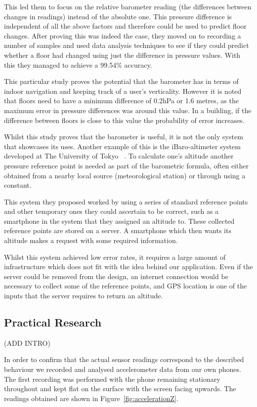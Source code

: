 \documentclass[12pt,a4paper]{report}
\begin{document}
This led them to focus on the relative barometer reading (the differences between changes in readings) instead of the absolute one. This pressure difference is independent of all the above factors and therefore could be used to predict floor changes. After proving this was indeed the case, they moved on to recording a number of samples and used data analysis techniques to see if they could predict whether a floor had changed using just the difference in pressure values. With this they managed to achieve a 99.54\% accuracy.

This particular study proves the potential that the barometer has in terms of indoor navigation and keeping track of a user's verticality. However it is noted that floors need to have a minimum difference of 0.2hPa or 1.6 metres, as the maximum error in pressure differences was around this value. In a building, if the difference between floors is close to this value the probability of error increases.

Whilst this study proves that the barometer is useful, it is not the only system that showcases its uses. Another example of this is the iBaro-altimeter system developed at The University of Tokyo ~\cite{baro22014}. To calculate one's altitude another pressure reference point is needed as part of the barometric formula, often either obtained from a nearby local source (meteorological station) or through using a constant.

This system they proposed worked by using a series of standard reference points and other temporary ones they could ascertain to be correct, such as a smartphone in the system that they assigned an altitude to. These collected reference points are stored on a server. A smartphone which then wants its altitude makes a request with some required information.

Whilst this system achieved low error rates, it requires a large amount of infrastructure which does not fit with the idea behind our application. Even if the server could be removed from the design, an internet connection would be necessary to collect some of the reference points, and GPS location is one of the inputs that the server requires to return an altitude.

\subsection{Practical Research}

(ADD INTRO)

In order to confirm that the actual sensor readings correspond to the described behaviour we recorded and analysed accelerometer data from our own phones. The first recording was performed with the phone remaining stationary throughout and kept flat on the surface with the screen facing upwards. The readings obtained are shown in Figure~\ref{fig:accelerationZ}.
\end{document}
